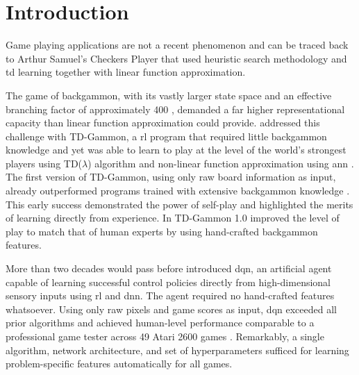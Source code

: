\chapter{Introduction}

Game playing applications are not a recent phenomenon and can be traced back to Arthur Samuel's Checkers Player \citep{samuelStudiesMachineLearning1959} that used heuristic search methodology and \acrfull{td} learning \citep[p.~121]{suttonReinforcementLearningIntroduction2020} together with linear function approximation. 

The game of backgammon, with its vastly larger state space and an effective branching factor of approximately 400 \citep[p.~422]{suttonReinforcementLearningIntroduction2020}, demanded a far higher representational capacity than linear function approximation could provide. \citet{tesauroTDGammonSelfTeachingBackgammon1994} addressed this challenge with TD-Gammon, a \acrfull{rl} program that required little backgammon knowledge and yet was able to learn to play at the level of the world's strongest players using TD($\lambda$) algorithm and non-linear function approximation using \acrfull{ann} \citep[p.~421]{suttonReinforcementLearningIntroduction2020}. The first version of TD-Gammon, using only raw board information as input, already outperformed programs trained with extensive backgammon knowledge \citep[p.~266]{tesauroPracticalIssuesTemporal1992}. This early success demonstrated the power of self-play and highlighted the merits of learning directly from experience. In TD-Gammon 1.0 \citet[p.~20]{tesauroTDGammonSelfTeachingBackgammon1994} improved the level of play to match that of human experts by using hand-crafted backgammon features.

More than two decades would pass before \citet[p.~529]{mnihHumanlevelControlDeep2015} introduced \acrfull{dqn}, an artificial agent capable of learning successful control policies directly from high-dimensional sensory inputs using \acrshort{rl} and \acrfull{dnn}. The agent required no hand-crafted features whatsoever. Using only raw pixels and game scores as input, \acrshort{dqn} exceeded all prior algorithms and achieved human-level performance comparable to a professional game tester across 49 Atari 2600 games \citep[Figure~3]{mnihHumanlevelControlDeep2015}. Remarkably, a single algorithm, network architecture, and set of hyperparameters sufficed for learning problem-specific features automatically for all games.

